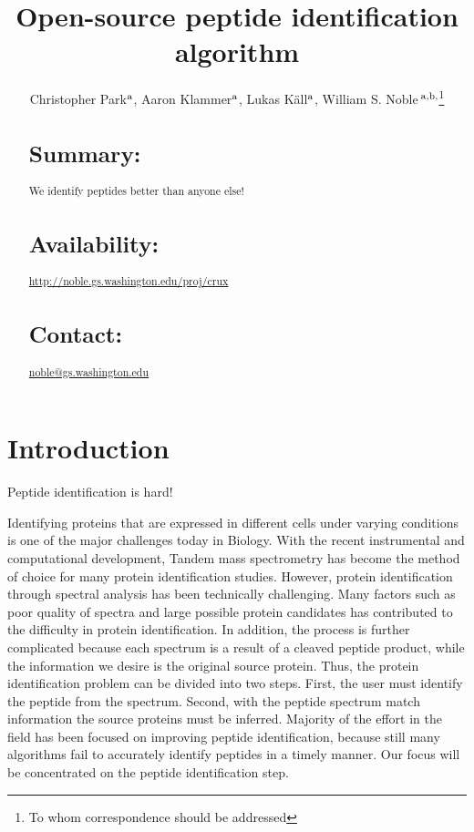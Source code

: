 \documentclass{bioinfo}
\begin{document}

\title[Open-source peptide identification algorithm]{Open-source
peptide identification algorithm}
\author[Park \textit{et~al}]{Christopher Park$^{\rm a}$, Aaron Klammer$^{\rm a}$,
Lukas K\"{a}ll$^{\rm a}$, 
William S. Noble\,$^{\rm a,b,}$\footnote{To whom correspondence should be addressed}}
\address{
$^{\rm a}$Department of Computer Science and Engineering,
$^{\rm b}$Department of Genome Sciences, University of Washington,
  Seattle, WA, USA
}
\maketitle

\begin{abstract}
\section{Summary:}

We identify peptides better than anyone else! 

\section{Availability:}
\href{http://noble.gs.washington.edu/proj/crux}{http://noble.gs.washington.edu/proj/crux}
\section{Contact:} \href{noble@gs.washington.edu}{noble@gs.washington.edu}
\end{abstract}

\section{Introduction}

Peptide identification is hard!

Identifying proteins that are expressed in different cells under varying conditions is one of the major challenges today in Biology. With the recent instrumental and computational development, Tandem mass spectrometry has become the method of choice for many protein identification studies. However, protein identification through spectral analysis has been technically challenging. Many factors such as poor quality of spectra and large possible protein candidates has contributed to the difficulty in protein identification. In addition, the process is further complicated because each spectrum is a result of a cleaved peptide product, while the information we desire is the original source protein. Thus, the protein identification problem can be divided into two steps. First, the user must identify the peptide from the spectrum. Second, with the peptide spectrum match information the source proteins must be inferred. Majority of the effort in the field has been focused on improving peptide identification, because still many algorithms fail to accurately identify peptides in a timely manner. Our focus will be concentrated on the peptide identification step. 
\end{document}
